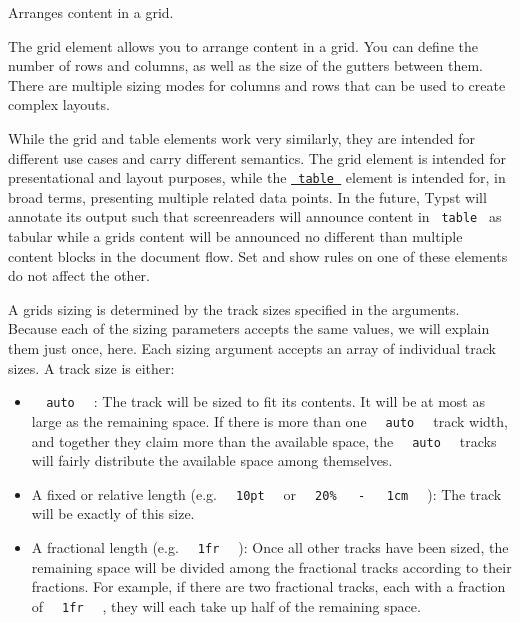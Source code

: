 Arranges content in a grid.

The grid element allows you to arrange content in a grid. You can define
the number of rows and columns, as well as the size of the gutters
between them. There are multiple sizing modes for columns and rows that
can be used to create complex layouts.

While the grid and table elements work very similarly, they are intended
for different use cases and carry different semantics. The grid element
is intended for presentational and layout purposes, while the
\href{/docs/reference/model/table/}{\texttt{\ table\ }} element is
intended for, in broad terms, presenting multiple related data points.
In the future, Typst will annotate its output such that screenreaders
will announce content in \texttt{\ table\ } as tabular while a
grid\textquotesingle s content will be announced no different than
multiple content blocks in the document flow. Set and show rules on one
of these elements do not affect the other.

A grid\textquotesingle s sizing is determined by the track sizes
specified in the arguments. Because each of the sizing parameters
accepts the same values, we will explain them just once, here. Each
sizing argument accepts an array of individual track sizes. A track size
is either:

\begin{itemize}
\item
  \texttt{\ }{\texttt{\ auto\ }}\texttt{\ } : The track will be sized to
  fit its contents. It will be at most as large as the remaining space.
  If there is more than one \texttt{\ }{\texttt{\ auto\ }}\texttt{\ }
  track width, and together they claim more than the available space,
  the \texttt{\ }{\texttt{\ auto\ }}\texttt{\ } tracks will fairly
  distribute the available space among themselves.
\item
  A fixed or relative length (e.g.
  \texttt{\ }{\texttt{\ 10pt\ }}\texttt{\ } or
  \texttt{\ }{\texttt{\ 20\%\ }}\texttt{\ }{\texttt{\ -\ }}\texttt{\ }{\texttt{\ 1cm\ }}\texttt{\ }
  ): The track will be exactly of this size.
\item
  A fractional length (e.g. \texttt{\ }{\texttt{\ 1fr\ }}\texttt{\ } ):
  Once all other tracks have been sized, the remaining space will be
  divided among the fractional tracks according to their fractions. For
  example, if there are two fractional tracks, each with a fraction of
  \texttt{\ }{\texttt{\ 1fr\ }}\texttt{\ } , they will each take up half
  of the remaining space.
\end{itemize}

